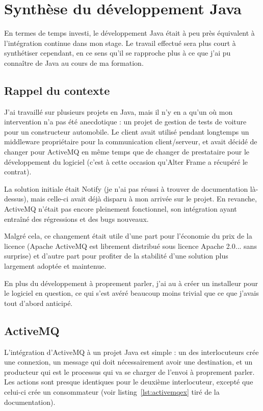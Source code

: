 \section{Synthèse du développement Java}
\label{sec:synthese_java}
En termes de temps investi, le développement Java était à peu près équivalent à l'intégration continue dans mon stage. Le travail effectué sera plus court à synthétiser cependant, en ce sens qu'il se rapproche plus à ce que j'ai pu connaître de Java au cours de ma formation.

\subsection{Rappel du contexte}
J'ai travaillé sur plusieurs projets en Java, mais il n'y en a qu'un où mon intervention n'a pas été anecdotique : un projet de gestion de tests de voiture pour un constructeur automobile. Le client avait utilisé pendant longtemps un middleware propriétaire pour la communication client/serveur, et avait décidé de changer pour ActiveMQ en même temps que de changer de prestataire pour le développement du logiciel (c'est à cette occasion qu'Alter Frame a récupéré le contrat).

La solution initiale était Notify (je n'ai pas réussi à trouver de documentation là-dessus), mais celle-ci avait déjà disparu à mon arrivée sur le projet. En revanche, ActiveMQ n'était pas encore pleinement fonctionnel, son intégration ayant entraîné des régressions et des bugs nouveaux.

Malgré cela, ce changement était utile d'une part pour l'économie du prix de la licence (Apache ActiveMQ est librement distribué sous licence Apache 2.0... sans surprise) et d'autre part pour profiter de la stabilité d'une solution plus largement adoptée et maintenue.

En plus du développement à proprement parler, j'ai au à créer un installeur pour le logiciel en question, ce qui s'est avéré beaucoup moins trivial que ce que j'avais tout d'abord anticipé.

\subsection{ActiveMQ}
L'intégration d'ActiveMQ à un projet Java est simple : un des interlocuteurs crée une connexion, un message qui doit nécessairement avoir une destination, et un producteur qui est le processus qui va se charger de l'envoi à proprement parler. Les actions sont presque identiques pour le deuxième interlocuteur, excepté que celui-ci crée un consommateur\cite{activemq_intro} (voir listing~\ref{lst:activemqex} tiré de la documentation).

